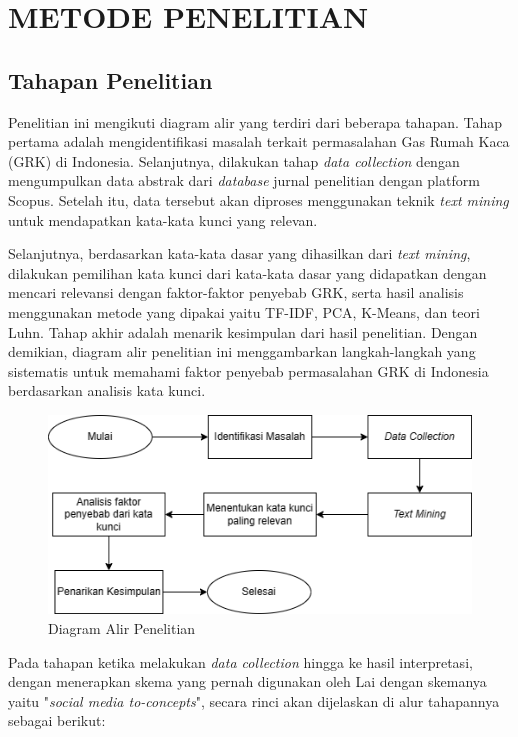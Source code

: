 \chapter{METODE PENELITIAN}
\label{BAB3:Metode}

\section{Tahapan Penelitian}
Penelitian ini mengikuti diagram alir yang terdiri dari beberapa tahapan. Tahap pertama adalah mengidentifikasi masalah terkait permasalahan Gas Rumah Kaca (GRK) di Indonesia. Selanjutnya, dilakukan tahap \textit{data collection} dengan mengumpulkan data abstrak dari \textit{database} jurnal penelitian dengan platform Scopus. Setelah itu, data tersebut akan diproses menggunakan teknik \textit{text mining} untuk mendapatkan kata-kata kunci yang relevan.

Selanjutnya, berdasarkan kata-kata dasar yang dihasilkan dari \textit{text mining}, dilakukan pemilihan kata kunci dari kata-kata dasar yang didapatkan dengan mencari relevansi dengan faktor-faktor penyebab GRK, serta hasil analisis menggunakan metode yang dipakai yaitu TF-IDF, PCA, K-Means, dan teori Luhn. Tahap akhir adalah menarik kesimpulan dari hasil penelitian. Dengan demikian, diagram alir penelitian ini menggambarkan langkah-langkah yang sistematis untuk memahami faktor penyebab permasalahan GRK di Indonesia berdasarkan analisis kata kunci.

\begin{figure}[!htp]
    \centering
    \includegraphics[width=0.825\linewidth]{img/bab3-11.png}
    \caption{Diagram Alir Penelitian}
    \label{fig:3-11}
\end{figure}

Pada tahapan ketika melakukan \textit{data collection} hingga ke hasil interpretasi, dengan menerapkan skema yang pernah digunakan oleh Lai \cite{lai_content_2015} dengan skemanya yaitu "\textit{social media to-concepts}", secara rinci akan dijelaskan di alur tahapannya sebagai berikut:
\newpage

